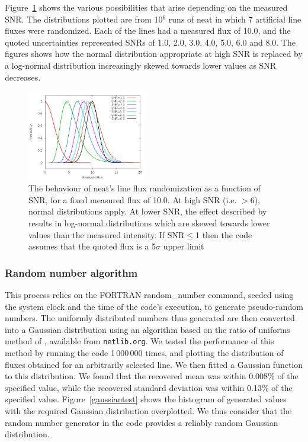 \documentclass[useAMS,usenatbib]{mn2e}
\begin{document}
Figure~\ref{distributions} shows the various possibilities that arise depending on the measured SNR.  The distributions plotted are from 10$^6$ runs of {\sc neat} in which 7 artificial line fluxes were randomized.  Each of the lines had a measured flux of 10.0, and the quoted uncertainties represented SNRs of 1.0, 2.0, 3.0, 4.0, 5.0, 6.0 and 8.0.  The figures shows how the normal distribution appropriate at high SNR is replaced by a log-normal distribution increasingly skewed towards lower values as SNR decreases.

\begin{figure}
\includegraphics[width=0.47\textwidth]{figures/distributions_2.png}
\caption{The behaviour of {\sc neat}'s line flux randomization as a function of SNR, for a fixed measured flux of 10.0.  At high SNR (i.e. $>$6), normal distributions apply.  At lower SNR, the effect described by \citet{1994A&A...287..676R} results in log-normal distributions which are skewed towards lower values than the measured intensity.  If SNR$\leq$1 then the code assumes that the quoted flux is a 5$\sigma$ upper limit}
\label{distributions}
\end{figure}

\subsubsection{Random number algorithm}

This process relies on the FORTRAN {\sc random\_number} command, seeded using the system clock and the time of the code's execution, to generate pseudo-random numbers.  The uniformly distributed numbers thus generated are then converted into a Gaussian distribution using an algorithm based on the ratio of uniforms method of \citet{Kinderman:1977:CGR:355744.355750}, available from \texttt{netlib.org}.  We tested the performance of this method by running the code 1\,000\,000 times, and plotting the distribution of fluxes obtained for an arbitrarily selected line.  We then fitted a Gaussian function to this distribution.  We found that the recovered mean was within 0.008\% of the specified value, while the recovered standard deviation was within 0.13\% of the specified value.  Figure~\ref{gaussiantest} shows the histogram of generated values with the required Gaussian distribution overplotted.  We thus consider that the random number generator in the code provides a reliably random Gaussian distribution.
\end{document}
